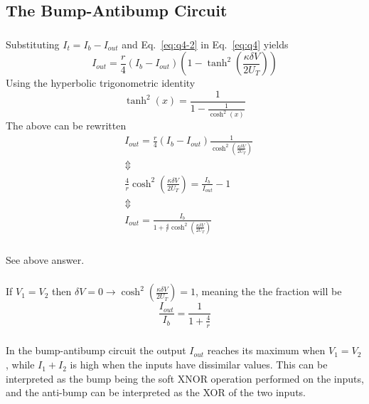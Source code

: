 \subsection{The Bump-Antibump Circuit}
\subsubsection{}
Substituting \(I_t=I_b-I_{out}\) and Eq.~\ref{eq:q4-2} in Eq.~\ref{eq:q4} yields
\begin{equation*}
    I_{out} = \frac{r}{4}\left(I_b-I_{out}\right)\left(1-\tanh^2\left(\frac{\kappa \delta V}{2U_T}\right)\right)
\end{equation*}
Using the hyperbolic trigonometric identity
\begin{equation*}
    \tanh^2\left(x\right) = \frac{1}{1-\frac{1}{\cosh^2\left(x\right)}}
\end{equation*}
The above can be rewritten
\begin{align*}
    &I_{out} = \frac{r}{4}\left(I_b-I_{out}\right)\frac{1}{\cosh^2\left(\frac{\kappa \delta V}{2U_T}\right)} \\
    &\Updownarrow \\
    &\frac{4}{r}\cosh^2\left(\frac{\kappa \delta V}{2U_T}\right) = \frac{I_b}{I_{out}} - 1 \\
    &\Updownarrow \\
    &I_{out} = \frac{I_b}{1+\frac{4}{r}\cosh^2\left(\frac{\kappa \delta V}{2U_T}\right)}
\end{align*}
\subsubsection{}
See above answer.
\subsubsection{}
If \(V_1=V_2\) then \(\delta V = 0 \rightarrow \cosh^2\left(\frac{\kappa \delta V}{2U_T}\right) = 1\), meaning the the fraction will be 
\begin{equation*}
    \frac{I_{out}}{I_b} = \frac{1}{1+\frac{4}{r}}
\end{equation*}
\subsubsection{}
In the bump-antibump circuit the output \(I_{out}\) reaches its maximum when \(V_1=V_2\), while \(I_1+I_2\) is high when the inputs have dissimilar
values. This can be interpreted as the bump being the soft XNOR operation performed on the inputs, and the anti-bump can be interpreted as the
XOR of the two inputs.

